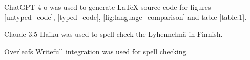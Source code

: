

ChatGPT 4-o was used to generate LaTeX source code for figures \ref{untyped_code}, \ref{typed_code}, \ref{fig:language_comparison} and table \ref{table:1}. 

Claude 3.5 Haiku was used to spell check the Lyhennelmä in Finnish.

Overleafs Writefull integration was used for spell checking.